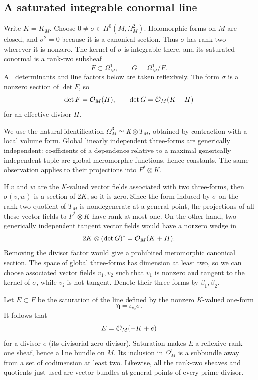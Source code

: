 \subsection{A saturated integrable conormal line}

Write $K=K_M$.  Choose $0\ne\sigma\in H^0(M,\Omega_M^2)$.  Holomorphic
forms on $M$ are closed, and $\sigma^2=0$ because it is a canonical
section.  Thus $\sigma$ has rank two wherever it is nonzero.  The kernel
of $\sigma$ is integrable there, and its saturated conormal is a rank-two
subsheaf
\[
 F\subset\Omega_M^1,\qquad G=\Omega_M^1/F.
\]
All determinants and line factors below are taken reflexively.  The form
$\sigma$ is a nonzero section of $\det F$, so
\begin{equation}\label{fol:F-and-G}
 \det F=\mathcal{O}_M(H),\qquad \det G=\mathcal{O}_M(K-H)
\end{equation}
for an effective divisor $H$.

We use the natural identification
$\Omega_M^3\simeq K\otimes T_M$, obtained by contraction with a local
volume form.  Global linearly independent three-forms are generically
independent: coefficients of a dependence relative to a maximal
generically independent tuple are global meromorphic functions, hence
constants.  The same observation applies to their projections into
$F^*\otimes K$.

If $v$ and $w$ are the $K$-valued vector fields associated with two
three-forms, then $\sigma(v,w)$ is a section of $2K$, so it is zero.
Since the form induced by $\sigma$ on the rank-two quotient of $T_M$ is
nondegenerate at a general point, the projections of all these vector
fields to $F^*\otimes K$ have rank at most one.  On the other hand, two
generically independent tangent vector fields would have a nonzero
wedge in
\[
 2K\otimes(\det G)^*=\mathcal{O}_M(K+H).
\]
Removing the divisor factor would give a prohibited meromorphic
canonical section.  The space of global three-forms has dimension at
least two, so we can choose associated vector fields $v_1,v_2$ such that
$v_1$ is nonzero and tangent to the kernel of $\sigma$, while $v_2$ is
not tangent.  Denote their three-forms by $\beta_1,\beta_2$.

Let $E\subset F$ be the saturation of the line defined by the nonzero
$K$-valued one-form
\[
 \boldsymbol\eta=\iota_{v_2}\sigma.
\]
It follows that
\begin{equation}\label{fol:E-class}
 E=\mathcal{O}_M(-K+e)
\end{equation}
for a divisor $e$ (its divisorial zero divisor).  Saturation makes $E$ a
reflexive rank-one sheaf, hence a line bundle on $M$.  Its inclusion in
$\Omega_M^1$ is a subbundle away from a set of codimension at least two.
Likewise, all the rank-two sheaves and quotients just used are vector
bundles at general points of every prime divisor.

